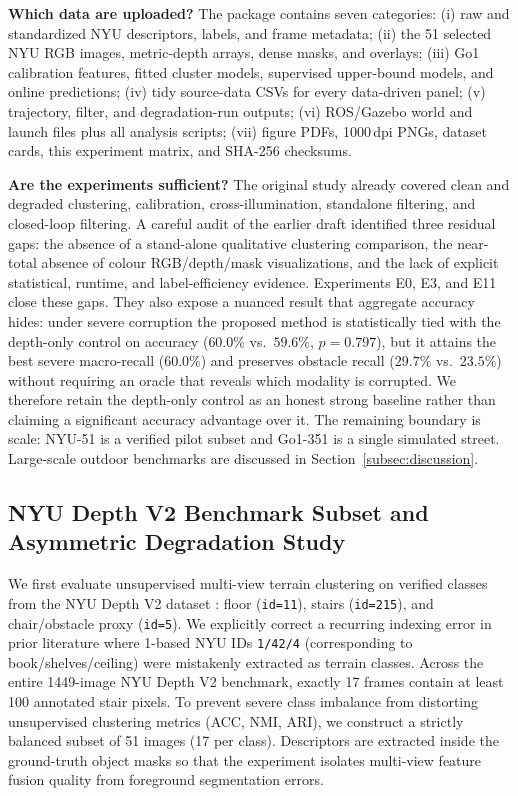 \documentclass[11pt, a4paper]{article}
\begin{document}
\textbf{Which data are uploaded?} The package contains seven categories: (i) raw and standardized NYU descriptors, labels, and frame metadata; (ii) the 51 selected NYU RGB images, metric-depth arrays, dense masks, and overlays; (iii) Go1 calibration features, fitted cluster models, supervised upper-bound models, and online predictions; (iv) tidy source-data CSVs for every data-driven panel; (v) trajectory, filter, and degradation-run outputs; (vi) ROS/Gazebo world and launch files plus all analysis scripts; (vii) figure PDFs, 1000\,dpi PNGs, dataset cards, this experiment matrix, and SHA-256 checksums.

\textbf{Are the experiments sufficient?} The original study already covered clean and degraded clustering, calibration, cross-illumination, standalone filtering, and closed-loop filtering. A careful audit of the earlier draft identified three residual gaps: the absence of a stand-alone qualitative clustering comparison, the near-total absence of colour RGB/depth/mask visualizations, and the lack of explicit statistical, runtime, and label-efficiency evidence. Experiments E0, E3, and E11 close these gaps. They also expose a nuanced result that aggregate accuracy hides: under severe corruption the proposed method is statistically tied with the depth-only control on accuracy ($60.0\%$ vs.\ $59.6\%$, $p=0.797$), but it attains the best severe macro-recall ($60.0\%$) and preserves obstacle recall ($29.7\%$ vs.\ $23.5\%$) without requiring an oracle that reveals which modality is corrupted. We therefore retain the depth-only control as an honest strong baseline rather than claiming a significant accuracy advantage over it. The remaining boundary is scale: NYU-51 is a verified pilot subset and Go1-351 is a single simulated street. Large-scale outdoor benchmarks are discussed in Section~\ref{subsec:discussion}.

\subsection{NYU Depth V2 Benchmark Subset and Asymmetric Degradation Study}
\label{subsec:nyu}
We first evaluate unsupervised multi-view terrain clustering on verified classes from the NYU Depth V2 dataset \cite{silberman2012indoor, tang2025cascading}: floor (\texttt{id=11}), stairs (\texttt{id=215}), and chair/obstacle proxy (\texttt{id=5}). We explicitly correct a recurring indexing error in prior literature where 1-based NYU IDs \texttt{1/42/4} (corresponding to book/shelves/ceiling) were mistakenly extracted as terrain classes. Across the entire 1449-image NYU Depth V2 benchmark, exactly 17 frames contain at least 100 annotated stair pixels. To prevent severe class imbalance from distorting unsupervised clustering metrics (ACC, NMI, ARI), we construct a strictly balanced subset of 51 images (17 per class). Descriptors are extracted inside the ground-truth object masks so that the experiment isolates multi-view feature fusion quality from foreground segmentation errors.
\end{document}
